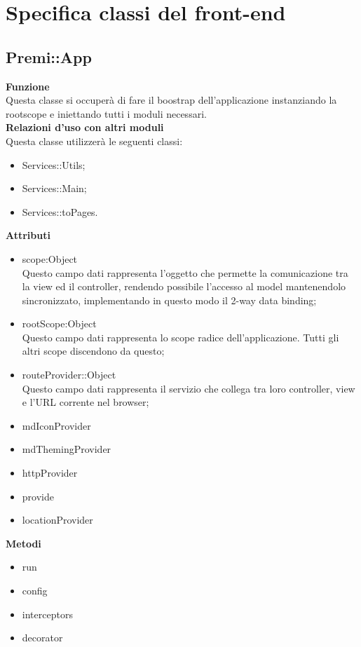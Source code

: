 \section {Specifica classi del front-end}
\subsection{Premi::App}
\label{sec:premiapp}
		\textbf{Funzione}\\
		\indent Questa classe si occuperà di fare il boostrap dell'applicazione instanziando la rootscope  e iniettando tutti i moduli necessari.\\
		\textbf{Relazioni d'uso con altri moduli}\\
		\indent Questa classe utilizzerà le seguenti classi:
		\begin{itemize}
		\item Services::Utils;
		\item Services::Main;
		\item Services::toPages.
		\end{itemize}
		\textbf{Attributi}\\
		\begin{itemize}
		\item scope:Object\\
		Questo campo dati rappresenta l’oggetto che permette la comunicazione tra la view ed il controller, rendendo possibile l’accesso al model mantenendolo sincronizzato, implementando in questo modo il 2-way data binding;
		\item rootScope:Object\\
		Questo campo dati rappresenta lo scope radice dell’applicazione. Tutti gli altri scope	discendono da questo;
		\item \textdollar routeProvider::Object\\
		Questo campo dati rappresenta il servizio che collega tra loro controller, view e l'URL corrente nel browser;
		\item \textdollar mdIconProvider\\
		\item \textdollar mdThemingProvider\\
		\item \textdollar httpProvider\\
		\item \textdollar provide\\
		\item \textdollar locationProvider\\
		\end{itemize}
		\textbf{Metodi}
		\begin{itemize}
		\item run
		\item config
		\item interceptors
		\item decorator
		\end{itemize}

